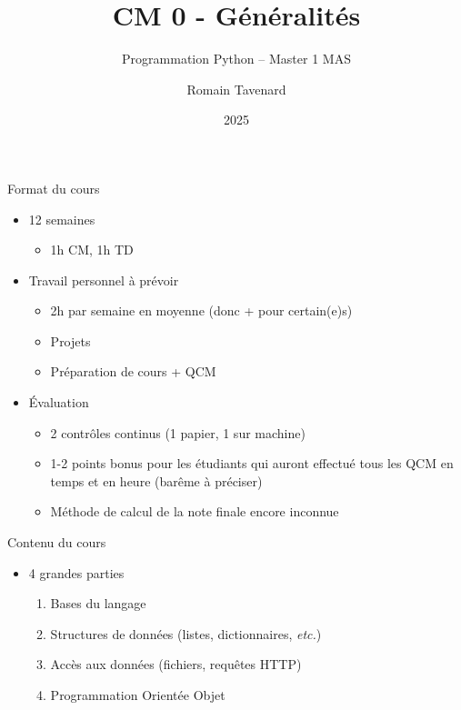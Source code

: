 \documentclass[10pt]{beamer}
\title[M1 MAS -- Python -- Généralités]{CM 0 - Généralités}
\subtitle{Programmation Python -- Master 1 MAS}
\author{Romain Tavenard}
\date{2025}
\institute{%
\hypersetup{urlcolor=.}
\makebox[2.2ex][c]{\faEnvelope}\enspace\href{mailto:romain.tavenard@univ-rennes2.fr}{\texttt{romain.tavenard@univ-rennes2.fr}}\\%
}
\begin{document}
\maketitle

\begin{frame}{Format du cours}  
  \begin{itemize}
    \item 12 semaines
    \begin{itemize}
      \item 1h CM, 1h TD
    \end{itemize}
    \item Travail personnel à prévoir
    \begin{itemize}
      \item 2h par semaine en moyenne (donc + pour certain(e)s)
      \item Projets
      \item Préparation de cours + QCM
    \end{itemize}
    \item Évaluation
    \begin{itemize}
      \item 2 contrôles continus (1 papier, 1 sur machine)
      \item 1-2 points bonus pour les étudiants qui auront effectué tous les QCM en temps et en heure (barême à préciser)
      \item Méthode de calcul de la note finale encore inconnue
    \end{itemize}
  \end{itemize}
\end{frame}

\begin{frame}{Contenu du cours}  
  \begin{itemize}
    \item 4 grandes parties
    \begin{enumerate}
      \item Bases du langage
      \item Structures de données (listes, dictionnaires, \emph{etc.})
      \item Accès aux données (fichiers, requêtes HTTP)
      \item Programmation Orientée Objet
    \end{enumerate}
  \end{itemize}
\end{frame}
\end{document}
